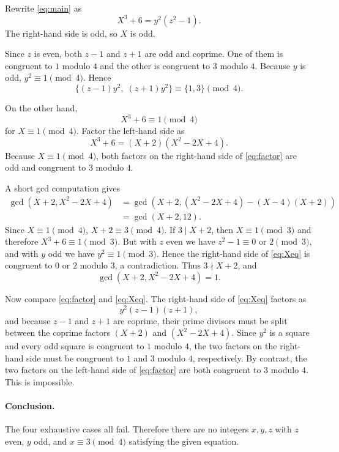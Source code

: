 \documentclass[11pt]{article}
\begin{document}
Rewrite \eqref{eq:main} as
\begin{equation}\label{eq:Xeq}
X^{3}+6 = y^{2}(z^{2}-1).
\end{equation}
The right-hand side is odd, so $X$ is odd.

Since $z$ is even, both $z-1$ and $z+1$ are odd and coprime. One of them is
congruent to $1$ modulo $4$ and the other is congruent to $3$ modulo $4$.
Because $y$ is odd, $y^{2}\equiv 1 \pmod 4$. Hence
\begin{equation}\label{eq:rhs-mod4}
\{(z-1)y^{2},\;(z+1)y^{2}\} \equiv \{1,3\} \pmod 4.
\end{equation}

On the other hand,
\begin{equation}\label{eq:mod4}
X^{3} + 6 \equiv 1 \pmod 4
\end{equation}
for $X \equiv 1 \pmod 4$. Factor the left-hand side as
\begin{equation}\label{eq:factor}
X^{3}+6 = (X+2)(X^{2}-2X+4).
\end{equation}
Because $X\equiv 1 \pmod 4$, both factors on the right-hand side of
\eqref{eq:factor} are odd and congruent to $3$ modulo $4$.

A short gcd computation gives
\begin{align*}
\gcd(X+2, X^{2}-2X+4)
&= \gcd(X+2, (X^{2}-2X+4) - (X-4)(X+2)) \\
&= \gcd(X+2, 12).
\end{align*}
Since $X\equiv 1 \pmod 4$, $X+2 \equiv 3 \pmod 4$. If $3 \mid X+2$, then
$X\equiv 1 \pmod 3$ and therefore $X^{3}+6\equiv 1 \pmod 3$. But with $z$ even
we have $z^{2}-1 \equiv 0$ or $2 \pmod 3$, and with $y$ odd we have
$y^{2} \equiv 1 \pmod 3$. Hence the right-hand side of \eqref{eq:Xeq} is
congruent to $0$ or $2$ modulo $3$, a contradiction. Thus $3\nmid X+2$, and
\begin{equation}\label{eq:gcd1}
\gcd(X+2, X^{2}-2X+4) = 1.
\end{equation}

Now compare \eqref{eq:factor} and \eqref{eq:Xeq}. The right-hand side of
\eqref{eq:Xeq} factors as
\[y^{2}(z-1)(z+1),\]
and because $z-1$ and $z+1$ are coprime, their prime divisors must be split
between the coprime factors $(X+2)$ and $(X^{2}-2X+4)$. Since $y^{2}$ is a
square and every odd square is congruent to $1$ modulo $4$, the two factors on
the right-hand side must be congruent to $1$ and $3$ modulo $4$, respectively.
By contrast, the two factors on the left-hand side of \eqref{eq:factor} are both
congruent to $3$ modulo $4$. This is impossible.

\paragraph{Conclusion.}
The four exhaustive cases all fail. Therefore there are no integers $x,y,z$ with
$z$ even, $y$ odd, and $x\equiv 3 \pmod 4$ satisfying the given equation.
\end{document}
